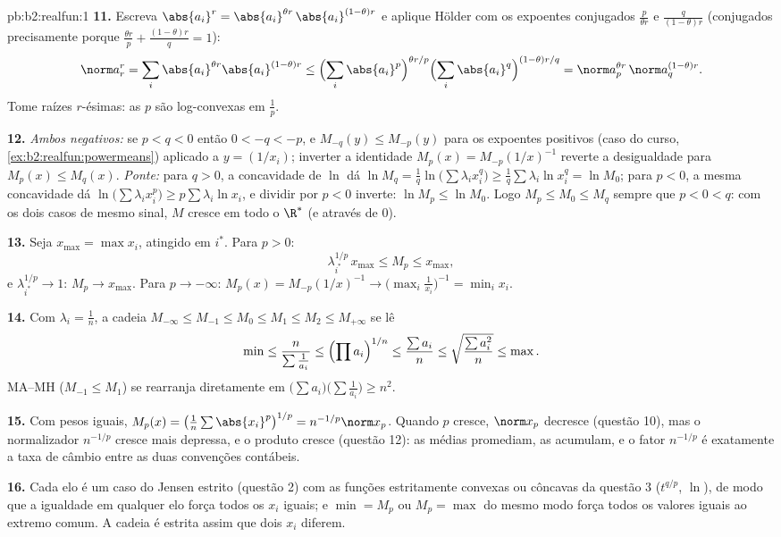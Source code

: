 \begin{solution}{pb:b2:realfun:1}
\textbf{11.} Escreva $\abs{a_i}^r = \abs{a_i}^{\theta
r}\,\abs{a_i}^{(1-\theta)r}$ e aplique Hölder com os
expoentes conjugados $\frac{p}{\theta r}$ e
$\frac{q}{(1-\theta)r}$ (conjugados precisamente porque $\frac{\theta
r}p + \frac{(1-\theta)r}q = 1$):
\[
\norm a_r^r = \sum_i \abs{a_i}^{\theta r}\abs{a_i}^{(1-\theta)r}
\leq \Bigl(\sum_i\abs{a_i}^{p}\Bigr)^{\theta r/p}
\Bigl(\sum_i\abs{a_i}^{q}\Bigr)^{(1-\theta)r/q}
= \norm a_p^{\theta r}\,\norm a_q^{(1-\theta)r} .
\]
Tome raízes $r$-ésimas: as  $p$ são log-convexas em $\frac1p$.

\textbf{12.} \emph{Ambos negativos:} se $p < q < 0$ então $0 < -q <
-p$, e $M_{-q}(y) \leq M_{-p}(y)$ para os expoentes positivos
(caso do curso, \cref{ex:b2:realfun:powermeans}) aplicado a $y =
(1/x_i)$; inverter a identidade $M_p(x) = M_{-p}(1/x)^{-1}$
reverte a desigualdade para $M_p(x) \leq M_q(x)$.
\emph{Ponte:} para $q > 0$, a concavidade de $\ln$ dá $\ln M_q =
\frac1q\ln\bigl(\sum\lambda_ix_i^q\bigr) \geq
\frac1q\sum\lambda_i\ln x_i^q = \ln M_0$; para $p < 0$, a mesma
concavidade dá $\ln\bigl(\sum\lambda_ix_i^p\bigr) \geq
p\sum\lambda_i\ln x_i$, e dividir por $p < 0$ inverte: $\ln M_p
\leq \ln M_0$. Logo $M_p \leq M_0 \leq M_q$ sempre que $p < 0 <
q$: com os dois casos de mesmo sinal, $M$ cresce em todo o
$\R^*$ (e através de $0$).

\textbf{13.} Seja $x_{\max} = \max x_i$, atingido em $i^*$. Para
$p > 0$:
\[
\lambda_{i^*}^{1/p}\,x_{\max} \leq M_p \leq x_{\max},
\]
e $\lambda_{i^*}^{1/p} \to 1$: $M_p \to x_{\max}$. Para $p \to
-\infty$: $M_p(x) = M_{-p}(1/x)^{-1} \to
\bigl(\max_i\frac1{x_i}\bigr)^{-1} = \min_ix_i$.

\textbf{14.} Com $\lambda_i = \frac1n$, a cadeia $M_{-\infty}
\leq M_{-1} \leq M_0 \leq M_1 \leq M_2 \leq M_{+\infty}$ se lê
\[
\min \leq \frac{n}{\sum\frac1{a_i}} \leq \Bigl(\prod
a_i\Bigr)^{1/n} \leq \frac{\sum a_i}{n} \leq
\sqrt{\frac{\sum a_i^2}{n}} \leq \max .
\]
MA--MH ($M_{-1} \leq M_1$) se rearranja diretamente em
$\bigl(\sum a_i\bigr)\bigl(\sum\frac1{a_i}\bigr) \geq n^2$.

\textbf{15.} Com pesos iguais, $M_p(x) =
\bigl(\frac1n\sum\abs{x_i}^p\bigr)^{1/p} = n^{-1/p}\norm x_p$.
Quando $p$ cresce, $\norm x_p$ decresce (questão 10), mas o
normalizador $n^{-1/p}$ cresce mais depressa, e o produto
cresce (questão 12): as médias promediam, as  acumulam, e
o fator $n^{-1/p}$ é exatamente a taxa de câmbio entre as
duas convenções contábeis.

\textbf{16.} Cada elo é um caso do Jensen estrito
(questão 2) com as funções estritamente convexas ou côncavas da
questão 3 ($t^{q/p}$, $\ln$), de modo que a igualdade em qualquer elo força
todos os $x_i$ iguais; e $\min = M_p$ ou $M_p = \max$ do mesmo modo
força todos os valores iguais ao extremo comum. A cadeia é
estrita assim que dois $x_i$ diferem.


\end{solution}
